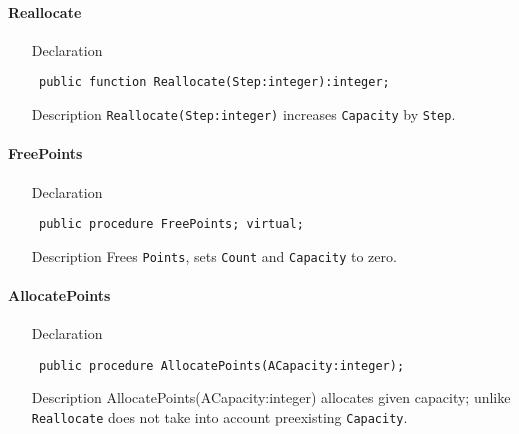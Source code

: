 \documentclass[12pt,a4paper,oneside]{report}
\newcommand{\declarationitem}[1]{{\addfontfeatures{FakeSlant} #1}}
\newcommand{\descriptiontitle}[1]{{\addfontfeatures{FakeSlant}#1}}
\newcommand{\code}[1]{\texttt{#1}}
\begin{document}
\paragraph{Reallocate}\hspace*{\fill}

\label{lmPointsVec.TPoints-Reallocate}
\begin{itemize}\item[\declarationitem{Declaration}\hfill]
	\begin{flushleft}
		\code{
			public function Reallocate(Step:integer):integer;}
		
	\end{flushleft}
	
	\par
	\item[\descriptiontitle{Description}]
	\code{Reallocate(Step:integer)} increases \code{Capacity} by \code{Step}.
	
\end{itemize}
\paragraph{FreePoints}\hspace*{\fill}

\label{lmPointsVec.TPoints-FreePoints}
\begin{itemize}\item[\declarationitem{Declaration}\hfill]
	\begin{flushleft}
		\code{
			public procedure FreePoints; virtual;}
	\end{flushleft}
\item[\descriptiontitle{Description}]
Frees \code{Points}, sets \code{Count} and \code{Capacity} to zero.	
\end{itemize}
\paragraph{AllocatePoints}\hspace*{\fill}

\label{lmPointsVec.TPoints-AllocatePoints}
\begin{itemize}\item[\declarationitem{Declaration}\hfill]
	\begin{flushleft}
		\code{
			public procedure AllocatePoints(ACapacity:integer);}
		
	\end{flushleft}
	
	\par
	\item[\descriptiontitle{Description}]
	AllocatePoints(ACapacity:integer) allocates given capacity; unlike \code{Reallocate} does not take into account preexisting \code{Capacity}.
	
\end{itemize}
\end{document}
